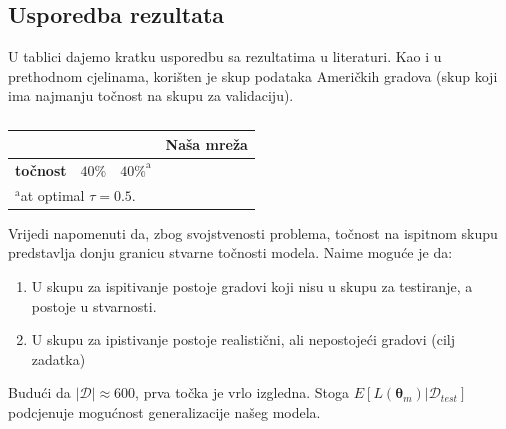 \documentclass[conference]{IEEEtran}
\begin{document}
\subsection{Usporedba rezultata}
U tablici dajemo kratku usporedbu sa rezultatima u literaturi.
Kao i u prethodnom cjelinama, korišten je skup podataka Američkih gradova (skup koji ima najmanju točnost na skupu za validaciju).
\begin{table}[H]
\caption{ }
\begin{center}
\begin{tabular}{|c|c|c|c|}
\hline
 & \textbf{\cite{randolph}} & \textbf{\cite{name_generator}} & \textbf{Naša mreža}  \\ \hline
\textbf{točnost} & $40\%$ & $40\%^{\mathrm{a}}$ &  \\ \hline
\multicolumn{4}{l}{$^{\mathrm{a}}$at optimal $\tau=0.5$.}
\end{tabular}
\label{tab:result}
\end{center}
\end{table}

Vrijedi napomenuti da, zbog svojstvenosti problema, točnost na ispitnom skupu predstavlja donju granicu stvarne točnosti modela. Naime moguće je da:
\begin{enumerate}
\item U skupu za ispitivanje postoje gradovi koji nisu u skupu za testiranje, a postoje u stvarnosti.
\item U skupu za ipistivanje postoje realistični, ali nepostojeći gradovi (cilj zadatka)
\end{enumerate}
Budući da $\lvert \mathcal{D} \rvert \approx 600$, prva točka je vrlo izgledna. Stoga $E[L(\mathbf{\boldsymbol{\theta}}_m) | \mathcal{D}_{test}]$ podcjenuje mogućnost generalizacije našeg modela.
\end{document}
